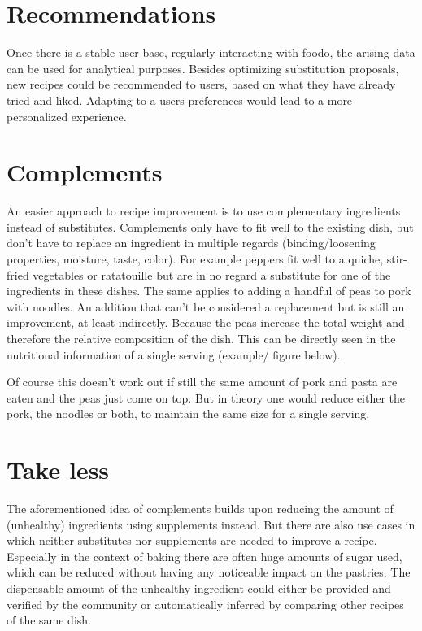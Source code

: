 \section{Recommendations}
Once there is a stable user base, regularly interacting with foodo, the arising data can be used for analytical purposes. Besides optimizing substitution proposals, new recipes could be recommended to users, based on what they have already tried and liked. Adapting to a users preferences would lead to a more personalized experience.

\section{Complements}
An easier approach to recipe improvement is to use complementary ingredients instead of substitutes. Complements only have to fit well to the existing dish, but don't have to replace an ingredient in multiple regards (binding/loosening properties, moisture, taste, color). 
For example peppers fit well to a quiche, stir-fried vegetables or ratatouille but are in no regard a substitute for one of the ingredients in these dishes. The same applies to adding a handful of peas to pork with noodles. An addition that can’t be considered a replacement but is still an improvement, at least indirectly. Because the peas increase the total weight and therefore the relative composition of the dish. This can be directly seen in the nutritional information of a single serving (example/ figure below). 

Of course this doesn’t work out if still the same amount of pork and pasta are eaten and the peas just come on top. But in theory one would reduce either the pork, the noodles or both, to maintain the same size for a single serving.

\section{Take less}
The aforementioned idea of complements builds upon reducing the amount of (unhealthy) ingredients using supplements instead. But there are also use cases in which neither substitutes nor supplements are needed to improve a recipe. Especially in the context of baking there are often huge amounts of sugar used, which can be reduced without having any noticeable impact on the pastries. The dispensable amount of the unhealthy ingredient could either be provided and verified by the community or automatically inferred by comparing other recipes of the same dish.

